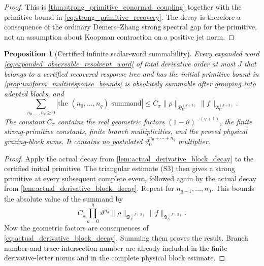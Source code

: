 \documentclass[11pt]{amsart}
\theoremstyle{compactplain}
\newtheorem*{proposition*}{Proposition}
\theoremstyle{compactdefinition}
\theoremstyle{compactremark}
\begin{document}
\begin{proof}
This is \cref{thm:strong_primitive_conormal_coupling} together with the
primitive bound in \eqref{eq:strong_primitive_recovery}.  The decay is therefore
a consequence of the ordinary Demers--Zhang strong spectral gap for the
primitive, not an assumption about Koopman contraction on a positive jet norm.
\end{proof}

\begin{proposition*}[Certified infinite scalar-word summability]
Every expanded word
\eqref{eq:expanded_observable_resolvent_word} of total derivative order at
most \(J\) that belongs to a certified recovered response tree and has the
initial primitive bound in \cref{prop:uniform_multiresponse_bounds} is
absolutely summable after grouping into adapted blocks, and
\[
  \sum_{n_0,\ldots,n_q\ge0}
  |\text{the }(n_0,\ldots,n_q)\text{ summand}|
  \le
  C_{\pi}
  \|\rho\|_{\mathfrak D_U^{(J+3)}}
  \|f\|_{\mathfrak A_U^{(J+3)}} .
\]
The constant \(C_\pi\) contains the real geometric factors
\((1-\vartheta)^{-(q+1)}\), the finite strong-primitive constants, finite branch multiplicities,
and the proved physical grazing-block sums.  It contains no postulated
\(\vartheta_0^{n_0+\cdots+n_q}\) multiplier.
\end{proposition*}

\begin{proof}
Apply the actual decay from
\cref{lem:actual_derivative_block_decay} to the certified initial primitive.
The triangular estimate (S3) then gives a strong primitive at every subsequent
complete event, followed again by the actual decay from
\cref{lem:actual_derivative_block_decay}.  Repeat for
\(n_{q-1},\ldots,n_0\).  This bounds the absolute value of the summand by
\[
  C_\pi
  \prod_{a=0}^q
  \vartheta^{n_a}
  \|\rho\|_{\mathfrak D_U^{(J+3)}}
  \|f\|_{\mathfrak A_U^{(J+3)}}.
\]
Now the geometric factors are consequences of
\eqref{eq:actual_derivative_block_decay}.  Summing them proves the result.
Branch number and trace-intersection number are already included in the
finite derivative-letter norms and in the complete physical block estimate.
\end{proof}
\end{document}
